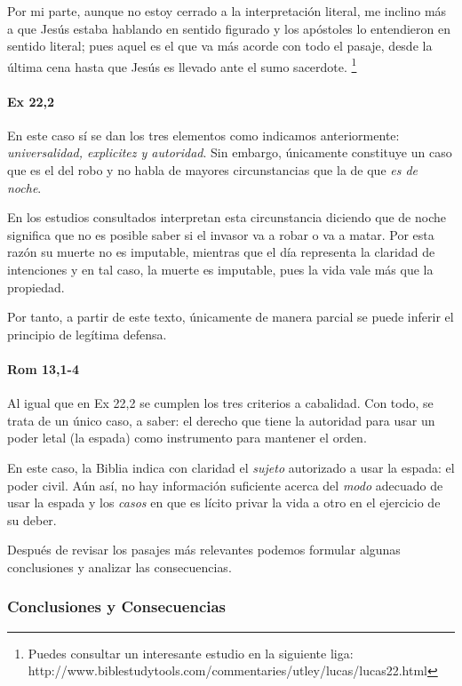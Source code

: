 \documentclass{article}
\begin{document}
Por mi parte, aunque no estoy cerrado a la interpretaci\'on literal, me inclino m\'as a que Jes\'us estaba hablando en sentido figurado y los ap\'ostoles lo entendieron en sentido literal; pues aquel es el que va m\'as acorde con todo el pasaje, desde la \'ultima cena hasta que Jes\'us es llevado ante el sumo sacerdote.%
    \footnote{Puedes consultar un interesante estudio en la siguiente liga: http://www.biblestudytools.com/commentaries/utley/lucas/lucas22.html}

\paragraph{Ex 22,2}

En este caso s\'{i} se dan los tres elementos como indicamos anteriormente: \emph{universalidad, explicitez y autoridad}. Sin embargo, \'unicamente constituye un caso que es el del robo y no habla de mayores circunstancias que la de que \emph{es de noche}.

En los estudios consultados interpretan esta circunstancia diciendo que de noche significa que no es posible saber si el invasor va a robar o va a matar. Por esta raz\'on su muerte no es imputable, mientras que el d\'{i}a representa la claridad de intenciones y en tal caso, la muerte es imputable, pues la vida vale m\'as que la propiedad.

Por tanto, a partir de este texto, \'unicamente de manera parcial se puede inferir el principio de leg\'{i}tima defensa.

\paragraph{Rom 13,1-4}

Al igual que en Ex 22,2 se cumplen los tres criterios a cabalidad. Con todo, se trata de un \'unico caso, a saber: el derecho que tiene la autoridad para usar un poder letal (la espada) como instrumento para mantener el orden.

En este caso, la Biblia indica con claridad el \emph{sujeto} autorizado a usar la espada: el poder civil. A\'un as\'{i}, no hay informaci\'on suficiente acerca del \emph{modo} adecuado de usar la espada y los \emph{casos} en que es l\'{i}cito privar la vida a otro en el ejercicio de su deber.

Despu\'es de revisar los pasajes m\'as relevantes podemos formular algunas conclusiones y analizar las consecuencias.

\subsubsection{Conclusiones y Consecuencias}
\end{document}
